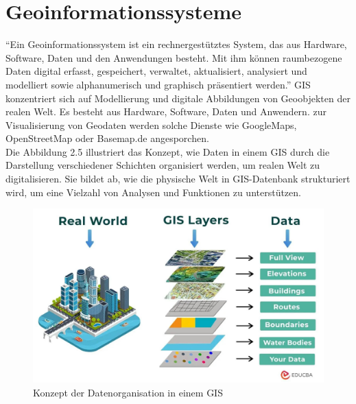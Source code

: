 \section{Geoinformationssysteme}
\label{sec:GIS}

``Ein Geoinformationssystem ist ein rechnergestütztes System, das aus Hardware, Software, Daten und den Anwendungen besteht. Mit ihm können raumbezogene Daten digital erfasst, gespeichert, verwaltet, aktualisiert, analysiert und modelliert sowie alphanumerisch und graphisch präsentiert werden.'' \citep[S. ~375]{de_lange_geoinformatik_2020} GIS konzentriert sich auf Modellierung und digitale Abbildungen von Geoobjekten der realen Welt. Es besteht aus Hardware, Software, Daten und Anwendern. zur Visualisierung von Geodaten werden solche Dienste wie GoogleMaps, OpenStreetMap oder Basemap.de angesporchen. \\


Die Abbildung 2.5 illustriert das Konzept, wie Daten in einem GIS durch die Darstellung verschiedener Schichten organisiert werden, um realen Welt zu digitalisieren. Sie bildet ab, wie die physische Welt in GIS-Datenbank strukturiert wird, um eine Vielzahl von Analysen und Funktionen zu unterstützen. 
\begin{figure}[ht]
  \centering
  \includegraphics[width=\linewidth]{images/gis.jpg}
  \caption{Konzept der Datenorganisation in einem GIS \citep{gis_bild}}
  \label{fig:meineabbildung}
\end{figure}

